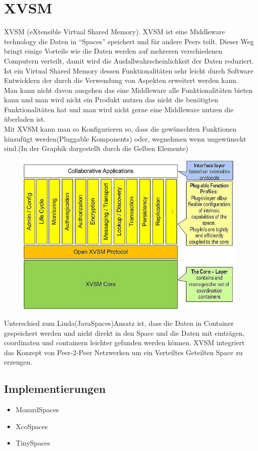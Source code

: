 \documentclass[a4paper,12pt]{scrreprt}
\begin{document}
		\section{XVSM}
		XVSM (eXtensible Virtual Shared Memory). XVSM ist eine Middleware technology die Daten in “Spaces” speichert  und für andere Peers teilt. Dieser Weg bringt einige Vorteile wie die Daten werden auf mehreren verschiedenen Computern verteilt, damit wird die Ausfallwahrscheinlichkeit der Daten reduziert.\\
		
		Ist ein Virtual Shared Memory dessen Funktionalitäten sehr leicht durch Software Entwicklern der durch die Verwendung von Aspekten erweitert werden kann. Man kann nicht davon ausgehen das eine Middleware alle Funktionalitäten bieten kann und man wird nicht ein Produkt nutzen das nicht die benötigten Funktionalitäten hat und man wird nicht gerne eine Middleware nutzen die überladen ist.\\
		Mit XVSM kann man so Konfigurieren so, dass die gewünschten Funktionen hinzufügt werden(Pluggable Komponents) oder, wegnehmen wenn ungewünscht sind.(In der Graphik dargestellt durch die Gelben Elemente)\\
		\begin{figure}[h]
\centering
\includegraphics[width=0.7\linewidth]{./08570620af}
\caption{}
\label{fig:08570620af}
\end{figure}

		
		Unterschied zum Linda(JavaSpaces)Ansatz ist, dass die Daten in Container gespeichert werden und nicht direkt in den Space und die Daten mit einträgen, coordinaten und containern leichter gefunden werden können.
		XVSM integriert das Konzept von Peer-2-Peer Netzwerken um ein Verteiltes Geteilten Space zu erzeugen.
		
		\subsection{Implementierungen}
			\begin{itemize}
			\item MozardSpaces
			\item XcoSpaces
			\item TinySpaces
			\end{itemize}
		
\end{document}

